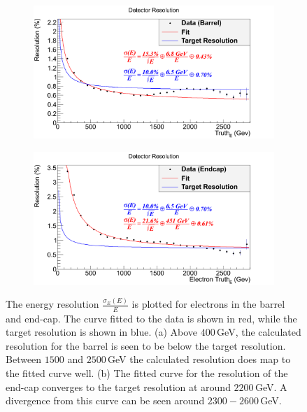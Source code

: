 \documentclass{article}
\begin{document}
\begin{figure}[h]
    \centering
    \begin{subfigure}{.49\textwidth}
        \includegraphics[height=0.6\textwidth]{images/resolution/barrelE.png}
        \caption{}
        \label{fig:barrelE}
    \end{subfigure}
    \begin{subfigure}{.49\textwidth}
        \includegraphics[height=0.6\textwidth]{images/resolution/endcapE.png}
        \caption{}
        \label{fig:endcapE}
    \end{subfigure}
    \caption{The energy resolution $\frac{\sigma_E(E)}{E}$ is plotted for electrons in the barrel and end-cap. The curve fitted to the data is shown in red, while the target resolution is shown in blue. (a) Above $400\,$GeV, the calculated resolution for the barrel is seen to be below the target resolution. Between $1500$ and $2500\,$GeV the calculated resolution does map to the fitted curve well. (b) The fitted curve for the  resolution of the end-cap converges to the target resolution at around $2200\,$GeV. A divergence from this curve can be seen around $2300-2600\,$GeV. \label{fig:resolutionE}}
\end{figure}
\end{document}
